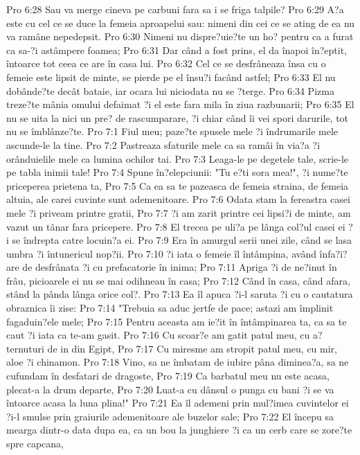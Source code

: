Pro 6:28  Sau va merge cineva pe carbuni fara sa i se friga talpile?
Pro 6:29  A?a este cu cel ce se duce la femeia aproapelui sau: nimeni din cei ce se ating de ea nu va ramâne nepedepsit.
Pro 6:30  Nimeni nu dispre?uie?te un ho? pentru ca a furat ca sa-?i astâmpere foamea;
Pro 6:31  Dar când a fost prins, el da înapoi în?eptit, întoarce tot ceea ce are în casa lui.
Pro 6:32  Cel ce se desfrâneaza însa cu o femeie este lipsit de minte, se pierde pe el însu?i facând astfel;
Pro 6:33  El nu dobânde?te decât bataie, iar ocara lui niciodata nu se ?terge.
Pro 6:34  Pizma treze?te mânia omului defaimat ?i el este fara mila în ziua razbunarii;
Pro 6:35  El nu se uita la nici un pre? de rascumparare, ?i chiar când îi vei spori darurile, tot nu se îmblânze?te.
Pro 7:1  Fiul meu; paze?te spusele mele ?i îndrumarile mele ascunde-le la tine.
Pro 7:2  Pastreaza sfaturile mele ca sa ramâi în via?a ?i orânduielile mele ca lumina ochilor tai.
Pro 7:3  Leaga-le pe degetele tale, scrie-le pe tabla inimii tale!
Pro 7:4  Spune în?elepciunii: "Tu e?ti sora mea!", ?i nume?te priceperea prietena ta,
Pro 7:5  Ca ea sa te pazeasca de femeia straina, de femeia altuia, ale carei cuvinte sunt ademenitoare.
Pro 7:6  Odata stam la fereastra casei mele ?i priveam printre gratii,
Pro 7:7  ?i am zarit printre cei lipsi?i de minte, am vazut un tânar fara pricepere.
Pro 7:8  El trecea pe uli?a pe lânga col?ul casei ei ?i se îndrepta catre locuin?a ei.
Pro 7:9  Era în amurgul serii unei zile, când se lasa umbra ?i întunericul nop?ii.
Pro 7:10  ?i iata o femeie îl întâmpina, având înfa?i?are de desfrânata ?i cu prefacatorie în inima;
Pro 7:11  Apriga ?i de ne?inut în frâu, picioarele ei nu se mai odihneau în casa;
Pro 7:12  Când în casa, când afara, stând la pânda lânga orice col?.
Pro 7:13  Ea îl apuca ?i-l saruta ?i cu o cautatura obraznica îi zise:
Pro 7:14  "Trebuia sa aduc jertfe de pace; astazi am împlinit fagaduin?ele mele;
Pro 7:15  Pentru aceasta am ie?it în întâmpinarea ta, ca sa te caut ?i iata ca te-am gasit.
Pro 7:16  Cu scoar?e am gatit patul meu, cu a?ternuturi de in din Egipt,
Pro 7:17  Cu miresme am stropit patul meu, cu mir, aloe ?i chinamon.
Pro 7:18  Vino, sa ne îmbatam de iubire pâna diminea?a, sa ne cufundam în desfatari de dragoste,
Pro 7:19  Ca barbatul meu nu este acasa, plecat-a la drum departe,
Pro 7:20  Luat-a cu dânsul o punga cu bani ?i se va întoarce acasa la luna plina!"
Pro 7:21  Ea îl ademeni prin mul?imea cuvintelor ei ?i-l smulse prin graiurile ademenitoare ale buzelor sale;
Pro 7:22  El începu sa mearga dintr-o data dupa ea, ca un bou la junghiere ?i ca un cerb care se zore?te spre capcana,
